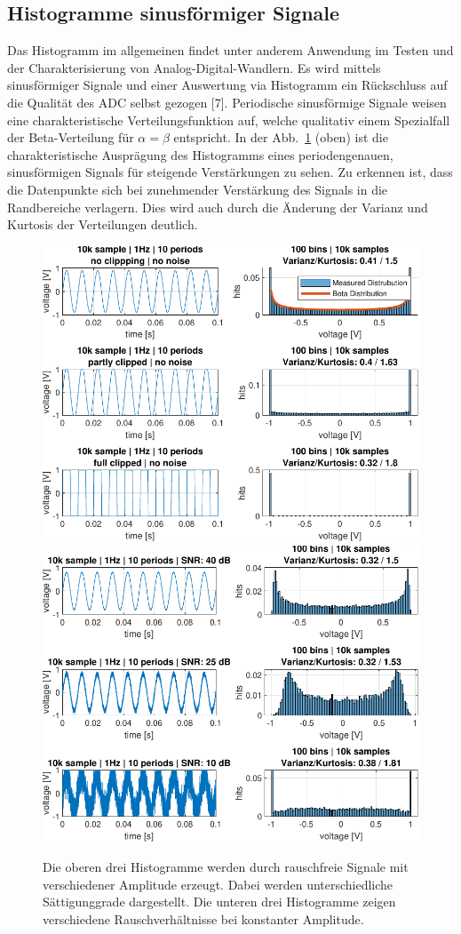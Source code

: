 \subsection{Histogramme sinusförmiger Signale }
Das Histogramm im allgemeinen findet unter anderem Anwendung im Testen und der Charakterisierung von Analog-Digital-Wandlern. Es wird mittels sinusförmiger Signale und einer Auswertung via Histogramm ein Rückschluss auf die Qualität des ADC selbst gezogen [7]. Periodische sinusförmige Signale weisen eine charakteristische Verteilungsfunktion auf, welche qualitativ einem Spezialfall der Beta-Verteilung für $\alpha = \beta$ entspricht. In der Abb.~\ref{fig:Histogramm-Gain} (oben) ist die charakteristische Ausprägung des Histogramms eines periodengenauen, sinusförmigen Signals für steigende Verstärkungen zu sehen. Zu erkennen ist, dass die Datenpunkte sich bei zunehmender Verstärkung des Signals in die Randbereiche verlagern. Dies wird auch durch die Änderung der Varianz und Kurtosis der Verteilungen deutlich.
\begin{figure}[h!] 
	\centering 
	\includegraphics[width=.9\columnwidth]{../img/beta-distribution.pdf}
	\includegraphics[width=.9\columnwidth]{../img/noise-histogramm.pdf}
	\caption{Die oberen drei Histogramme werden durch rauschfreie Signale mit verschiedener Amplitude erzeugt. Dabei werden unterschiedliche Sättigunggrade dargestellt. Die unteren drei Histogramme zeigen verschiedene Rauschverhältnisse bei konstanter Amplitude.}
	\label{fig:Histogramm-Gain}
\end{figure} 
